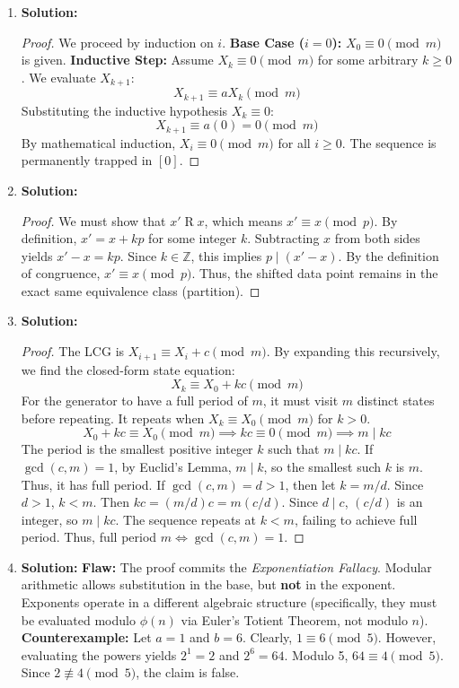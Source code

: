 \documentclass[11pt, a4paper]{article}
\theoremstyle{definition}
\theoremstyle{remark}
\newcommand{\Z}{\mathbb{Z}}
\begin{document}
\begin{enumerate}[label=\textbf{\arabic*.}]
    \item \textbf{Solution:}
    \begin{proof}
    We proceed by induction on $i$.
    \textbf{Base Case ($i=0$):} $X_0 \equiv 0 \pmod{m}$ is given.
    \textbf{Inductive Step:} Assume $X_k \equiv 0 \pmod{m}$ for some arbitrary $k \ge 0$. We evaluate $X_{k+1}$:
    \[ X_{k+1} \equiv a X_k \pmod{m} \]
    Substituting the inductive hypothesis $X_k \equiv 0$:
    \[ X_{k+1} \equiv a(0) = 0 \pmod{m} \]
    By mathematical induction, $X_i \equiv 0 \pmod{m}$ for all $i \ge 0$. The sequence is permanently trapped in $[0]$.
    \end{proof}

    \item \textbf{Solution:}
    \begin{proof}
    We must show that $x' \mathrel{R} x$, which means $x' \equiv x \pmod{p}$.
    By definition, $x' = x + kp$ for some integer $k$.
    Subtracting $x$ from both sides yields $x' - x = kp$.
    Since $k \in \Z$, this implies $p \mid (x' - x)$.
    By the definition of congruence, $x' \equiv x \pmod{p}$. Thus, the shifted data point remains in the exact same equivalence class (partition).
    \end{proof}

    \item \textbf{Solution:}
    \begin{proof}
    The LCG is $X_{i+1} \equiv X_i + c \pmod{m}$. By expanding this recursively, we find the closed-form state equation:
    \[ X_k \equiv X_0 + kc \pmod{m} \]
    For the generator to have a full period of $m$, it must visit $m$ distinct states before repeating. It repeats when $X_k \equiv X_0 \pmod{m}$ for $k > 0$.
    \[ X_0 + kc \equiv X_0 \pmod{m} \implies kc \equiv 0 \pmod{m} \implies m \mid kc \]
    The period is the smallest positive integer $k$ such that $m \mid kc$. 
    If $\gcd(c,m) = 1$, by Euclid's Lemma, $m \mid k$, so the smallest such $k$ is $m$. Thus, it has full period.
    If $\gcd(c,m) = d > 1$, then let $k = m/d$. Since $d > 1$, $k < m$. Then $kc = (m/d)c = m(c/d)$. Since $d \mid c$, $(c/d)$ is an integer, so $m \mid kc$. The sequence repeats at $k < m$, failing to achieve full period.
    Thus, full period $m \iff \gcd(c,m) = 1$.
    \end{proof}

    \item \textbf{Solution:}
    \textbf{Flaw:} The proof commits the \textit{Exponentiation Fallacy}. Modular arithmetic allows substitution in the base, but \textbf{not} in the exponent. Exponents operate in a different algebraic structure (specifically, they must be evaluated modulo $\phi(n)$ via Euler's Totient Theorem, not modulo $n$).\\
    \textbf{Counterexample:} Let $a = 1$ and $b = 6$. Clearly, $1 \equiv 6 \pmod{5}$. However, evaluating the powers yields $2^1 = 2$ and $2^6 = 64$. Modulo 5, $64 \equiv 4 \pmod{5}$. Since $2 \not\equiv 4 \pmod{5}$, the claim is false.


\end{enumerate}
\end{document}
